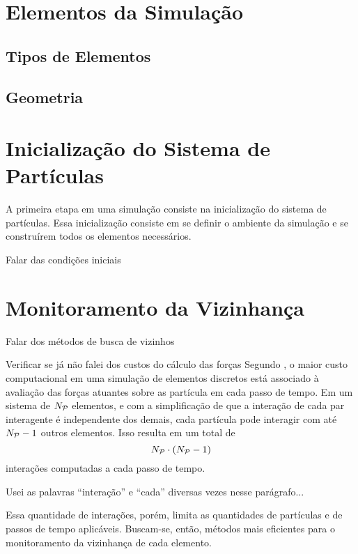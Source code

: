 \section{Elementos da Simulação}

\subsection{Tipos de Elementos}
\subsection{Geometria}

\section{Inicialização do Sistema de Partículas}

A primeira etapa em uma simulação \DEM{} consiste na inicialização do sistema de partículas. Essa inicialização consiste em se definir o ambiente da simulação e se construírem todos os elementos necessários.

\alert{Falar das condições iniciais}

\section{Monitoramento da Vizinhança} \label{sec:neighborhood}

\alert{Falar dos métodos de busca de vizinhos}

\alert{Verificar se já não falei dos custos do cálculo das forças} Segundo , o maior custo computacional em uma simulação de elementos discretos está associado à avaliação das forças atuantes sobre as partícula em cada passo de tempo. Em um sistema de \(N_{\mathcal{P}}\) elementos, e com a simplificação de que a interação de cada par interagente é independente dos demais, cada partícula pode interagir com até \(N_{\mathcal{P}}-1\) outros elementos. Isso resulta em um total de
\begin{equation*}
	\numberOfParticles\cdot\pqty{\numberOfParticles-1}
\end{equation*}
interações computadas a cada passo de tempo.

\alert{Usei as palavras ``interação'' e ``cada'' diversas vezes nesse parágrafo...}

Essa quantidade de interações, porém, limita as quantidades de partículas e de passos de tempo aplicáveis. Buscam-se, então, métodos mais eficientes para o monitoramento da vizinhança de cada elemento. 

